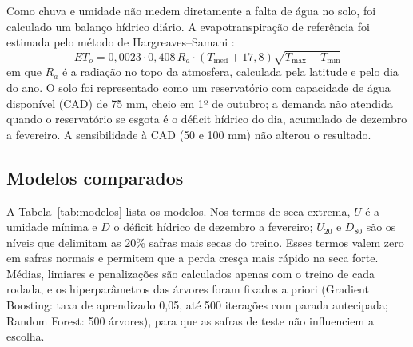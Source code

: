 \documentclass[12pt]{article}
\begin{document}
Como chuva e umidade não medem diretamente a falta de água no solo, foi
calculado um balanço hídrico diário. A evapotranspiração de referência
foi estimada pelo método de Hargreaves--Samani \cite{hargreaves1985}:
\begin{equation}
ET_o = 0{,}0023 \cdot 0{,}408\,R_a \cdot (T_{\mathrm{med}} + 17{,}8)
\sqrt{T_{\mathrm{max}} - T_{\mathrm{min}}}
\end{equation}
em que $R_a$ é a radiação no topo da atmosfera, calculada pela latitude e
pelo dia do ano. O solo foi representado como um reservatório com
capacidade de água disponível (CAD) de 75 mm, cheio em 1º de outubro; a
demanda não atendida quando o reservatório se esgota é o déficit hídrico
do dia, acumulado de dezembro a fevereiro. A sensibilidade à CAD (50 e
100 mm) não alterou o resultado.

\subsection{Modelos comparados}

A Tabela~\ref{tab:modelos} lista os modelos. Nos termos de seca extrema,
$U$ é a umidade mínima e $D$ o déficit hídrico de dezembro a fevereiro;
$U_{20}$ e $D_{80}$ são os níveis que delimitam as 20\% safras mais secas
do treino. Esses termos valem zero em safras normais e permitem que a
perda cresça mais rápido na seca forte. Médias, limiares e penalizações
são calculados apenas com o treino de cada rodada, e os hiperparâmetros
das árvores foram fixados a priori (Gradient Boosting: taxa de
aprendizado 0,05, até 500 iterações com parada antecipada; Random Forest:
500 árvores), para que as safras de teste não influenciem a escolha.
\end{document}
